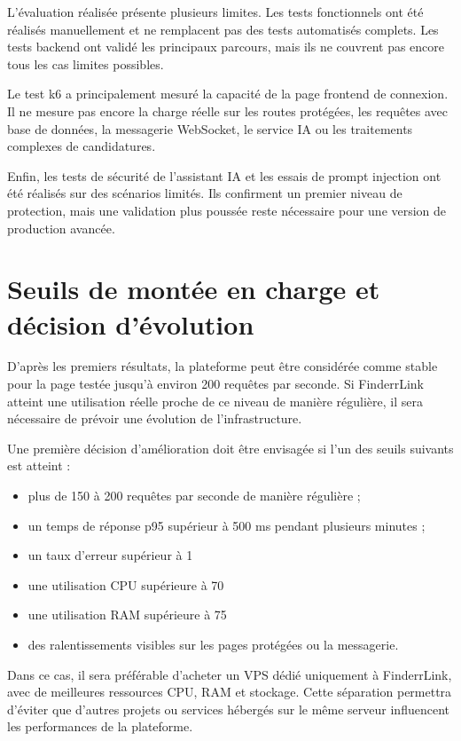 L'évaluation réalisée présente plusieurs limites. Les tests fonctionnels ont été réalisés manuellement et ne remplacent pas des tests automatisés complets. Les tests backend ont validé les principaux parcours, mais ils ne couvrent pas encore tous les cas limites possibles.

Le test k6 a principalement mesuré la capacité de la page frontend de connexion. Il ne mesure pas encore la charge réelle sur les routes protégées, les requêtes avec base de données, la messagerie WebSocket, le service IA ou les traitements complexes de candidatures.

Enfin, les tests de sécurité de l'assistant IA et les essais de prompt injection ont été réalisés sur des scénarios limités. Ils confirment un premier niveau de protection, mais une validation plus poussée reste nécessaire pour une version de production avancée.

\section{Seuils de montée en charge et décision d'évolution}

D'après les premiers résultats, la plateforme peut être considérée comme stable pour la page testée jusqu'à environ 200 requêtes par seconde. Si FinderrLink atteint une utilisation réelle proche de ce niveau de manière régulière, il sera nécessaire de prévoir une évolution de l'infrastructure.

Une première décision d'amélioration doit être envisagée si l'un des seuils suivants est atteint :

\begin{itemize}
\item plus de 150 à 200 requêtes par seconde de manière régulière ;
\item un temps de réponse p95 supérieur à 500 ms pendant plusieurs minutes ;
\item un taux d'erreur supérieur à 1%
\item une utilisation CPU supérieure à 70%
\item une utilisation RAM supérieure à 75%
\item des ralentissements visibles sur les pages protégées ou la messagerie.
\end{itemize}

Dans ce cas, il sera préférable d'acheter un VPS dédié uniquement à FinderrLink, avec de meilleures ressources CPU, RAM et stockage. Cette séparation permettra d'éviter que d'autres projets ou services hébergés sur le même serveur influencent les performances de la plateforme.

